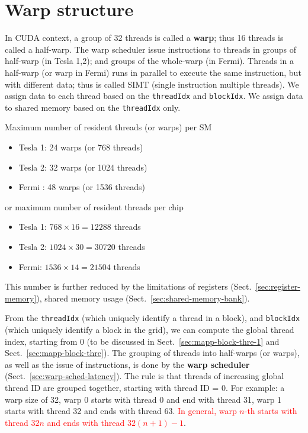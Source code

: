 \section{Warp structure}
\label{sec:warp-structure}


In CUDA context, a group of 32 threads is called a {\bf warp}; thus 16
threads is called a half-warp.  The warp scheduler issue instructions
to threads in groups of half-warp (in Tesla 1,2); and groups of the
whole-warp (in Fermi).  Threads in a half-warp (or warp in Fermi) runs
in parallel to execute the same instruction, but with different data;
thus is called SIMT (single instruction multiple threads). We assign
data to each thread based on the \verb!threadIdx!  and
\verb!blockIdx!. We assign data to shared memory based on the
\verb!threadIdx! only.

\begin{framed}
  Maximum number of resident threads (or warps) per SM
  \begin{itemize}
  \item Tesla 1: 24 warps (or 768 threads)
  \item Tesla 2: 32 warps (or 1024 threads)
  \item Fermi : 48 warps (or 1536 threads)
  \end{itemize}
  or maximum number of resident threads per chip
  \begin{itemize}
  \item Tesla 1: $768\times 16 = 12288$ threads
  \item Tesla 2: $1024\times 30 = 30720$ threads
  \item Fermi: $1536\times 14 = 21504$ threads
  \end{itemize}

  This number is further reduced by the limitations of registers
  (Sect.~\ref{sec:register-memory}), shared memory usage
  (Sect.~\ref{sec:shared-memory-bank}). 
\end{framed}


From the \verb!threadIdx! (which uniquely identify a thread in a
block), and \verb!blockIdx! (which uniquely identify a block in the
grid), we can compute the global thread index, starting from 0 (to be
discussed in Sect.~\ref{sec:mapp-block-thre-1} and
Sect.~\ref{sec:mapp-block-thre}).  The grouping of threads into
half-warps (or warps), as well as the issue of instructions, is done
by the {\bf warp scheduler} (Sect.~\ref{sec:warp-sched-latency}).  The
rule is that threads of increasing global thread ID are grouped
together, starting with thread ID = 0. For example: a warp size of 32,
warp 0 starts with thread 0 and end with thread 31, warp 1 starts with
thread 32 and ends with thread 63.
\textcolor{red}{In general, warp $n$-th starts with thread $32n$ and
  ends with thread $32(n+1)-1$}.

